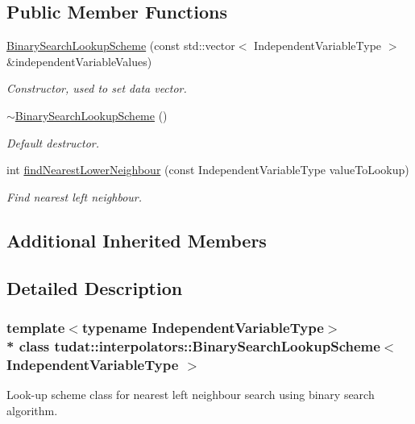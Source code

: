 \subsection*{Public Member Functions}
\begin{DoxyCompactItemize}
\item 
\hyperlink{classtudat_1_1interpolators_1_1BinarySearchLookupScheme_aa2ef6246aeee011cb6ab3786d0386481}{Binary\+Search\+Lookup\+Scheme} (const std\+::vector$<$ Independent\+Variable\+Type $>$ \&independent\+Variable\+Values)
\begin{DoxyCompactList}\small\item\em Constructor, used to set data vector. \end{DoxyCompactList}\item 
\hyperlink{classtudat_1_1interpolators_1_1BinarySearchLookupScheme_ae0a878950e354c57efb3fac7d402a47e}{$\sim$\+Binary\+Search\+Lookup\+Scheme} ()
\begin{DoxyCompactList}\small\item\em Default destructor. \end{DoxyCompactList}\item 
int \hyperlink{classtudat_1_1interpolators_1_1BinarySearchLookupScheme_a9c91bd06d198e6a5dc2a15ad7314c91f}{find\+Nearest\+Lower\+Neighbour} (const Independent\+Variable\+Type value\+To\+Lookup)
\begin{DoxyCompactList}\small\item\em Find nearest left neighbour. \end{DoxyCompactList}\end{DoxyCompactItemize}
\subsection*{Additional Inherited Members}


\subsection{Detailed Description}
\subsubsection*{template$<$typename Independent\+Variable\+Type$>$\\*
class tudat\+::interpolators\+::\+Binary\+Search\+Lookup\+Scheme$<$ Independent\+Variable\+Type $>$}

Look-\/up scheme class for nearest left neighbour search using binary search algorithm. 

